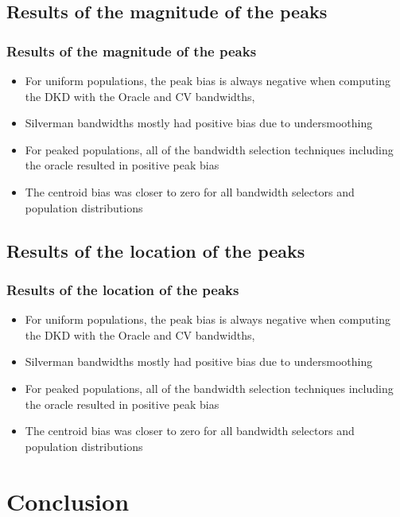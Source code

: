 \documentclass[notheorems]{beamer}
\theoremstyle{definition}
\theoremstyle{example}
\begin{document}
\subsection{Results of the magnitude of the peaks}
\begin{frame}\frametitle{Results of the magnitude of the peaks}
    \footnotesize
    \begin{itemize}
        \item For uniform populations, the peak bias is always negative when computing the DKD with the Oracle and CV bandwidths,
        \item Silverman bandwidths mostly had positive bias due to undersmoothing
        \item For peaked populations, all of the bandwidth selection techniques including the oracle resulted in positive peak bias
        \item The centroid bias was closer to zero for all bandwidth selectors and population distributions
    \end{itemize}
\end{frame}

\subsection{Results of the location of the peaks}
\begin{frame}\frametitle{Results of the location of the peaks}
    \footnotesize
    \begin{itemize}
        \item For uniform populations, the peak bias is always negative when computing the DKD with the Oracle and CV bandwidths,
        \item Silverman bandwidths mostly had positive bias due to undersmoothing
        \item For peaked populations, all of the bandwidth selection techniques including the oracle resulted in positive peak bias
        \item The centroid bias was closer to zero for all bandwidth selectors and population distributions
    \end{itemize}
\end{frame}

\section{Conclusion}
\end{document}
